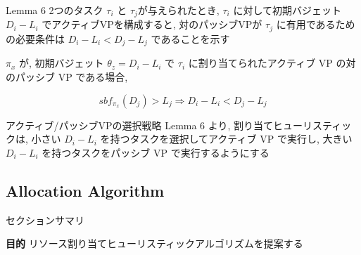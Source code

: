 \begin{frame}[label=lemma6]{Lemma 6}
    2つのタスク $\tau_{i}$ と $\tau_{j}$が与えられたとき, $\tau_i$ に対して初期バジェット $D_{i}-L_{i}$ でアクティブVPを構成すると, 対のパッシブVPが $\tau_j$ に有用であるための必要条件は $D_{i}-L_{i}<D_{j}-L_{j}$ であることを示す
    \begin{lemma}[]
        $\pi_{x}$ が, 初期バジェット $\theta_{z}=D_{i}-L_{i}$ で $\tau_{i}$ に割り当てられたアクティブ VP の対のパッシブ VP である場合,

        \begin{equation*}
            s b f_{\pi_{x}}\left(D_{j}\right)>L_{j} \Rightarrow D_{i}-L_{i}<D_{j}-L_{j}
        \end{equation*}
    \end{lemma}
\end{frame}

\begin{frame}{アクティブ/パッシブVPの選択戦略}
    Lemma 6 より, 割り当てヒューリスティックは, 小さい $D_{i}-L_{i}$ を持つタスクを選択してアクティブ VP で実行し, 大きい $D_{i}-L_{i}$ を持つタスクをパッシブ VP で実行するようにする
\end{frame}



\subsection{Allocation Algorithm}
\label{ssec: allocation algorithm}

\begin{frame}{セクションサマリ}
    \begin{itembox}[l]{\textbf{目的}}
        リソース割り当てヒューリスティックアルゴリズムを提案する
    \end{itembox}
\end{frame}

